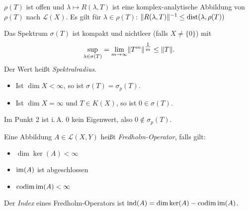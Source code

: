 \documentclass{cheat-sheet}
\newcommand{\dist}{\mathrm{dist}} %
\newcommand{\codim}{\mathrm{codim}} %
\begin{document}
\begin{satz}
  $\rho(T)$ ist offen und $\lambda \mapsto R(\lambda, T)$ ist eine komplex-analytische Abbildung von $\rho(T)$ nach $\mathcal{L}(X)$. Es gilt für $\lambda \in \rho(T)$: $\norm{R(\lambda, T)}^{-1} \leq \dist(\lambda, \rho(T))$
\end{satz}

\begin{satz}
  Das Spektrum $\sigma(T)$ ist kompakt und nichtleer (falls $X \not= \{ 0 \}$) mit
  \[ \sup_{\lambda \in \sigma(T)} = \lim_{m \to \infty} \lVert T^m\rVert^{\tfrac{1}{m}} \leq \lVert T\rVert. \]
  Der Wert heißt \emph{Spektralradius}.
\end{satz}


\begin{lem}
  \begin{itemize}
    \item Ist $\dim X < \infty$, so ist $\sigma(T) = \sigma_p(T)$.
    \item Ist $\dim X = \infty$ und $T \in K(X)$, so ist $0 \in \sigma(T)$.
  \end{itemize}
\end{lem}

\begin{bem}
  Im Punkt 2 ist i.\,A. $0$ kein Eigenwert, also $0 \not\in \sigma_p(T)$.
\end{bem}



\begin{definition}
  Eine Abbildung $A \in \mathcal{L}(X, Y)$ heißt \emph{Fredholm-Operator}, falls gilt:
  \begin{itemize}
    \item $\dim \ker(A) < \infty$
    \item $\mathop{\mathrm{im}}(A)$ ist abgeschlossen
    \item $\codim \im(A) < \infty$
  \end{itemize}
  Der \emph{Index} eines Fredholm-Operators ist $\mathrm{ind}(A) = \dim \ker (A) - \codim \im(A)$.
\end{definition}
\end{document}
